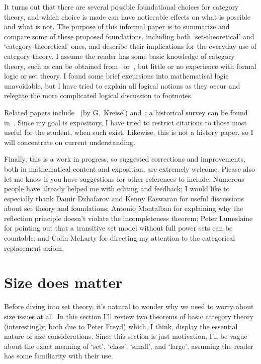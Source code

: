 \documentclass[12pt]{amsart}
\begin{document}
It turns out that there are several possible foundational choices for
category theory, and which choice is made can have noticeable effects
on what is possible and what is not.  The purpose of this informal
paper is to summarize and compare some of these proposed foundations,
including both `set-theoretical' and `category-theoretical' ones, and
describe their implications for the everyday use of category theory.
I assume the reader has some basic knowledge of category theory, such
as can be obtained from~\cite{maclane} or~\cite{awodey:cat-thy}, but
little or no experience with formal logic or set theory.  I found some
brief excursions into mathematical logic unavoidable, but I have tried
to explain all logical notions as they occur and relegate the more
complicated logical discussion to footnotes.

Related papers include~\cite[Appendix II]{feferman:fdns-of-ct} (by G.\
Kreisel) and~\cite{blass:ct-setth}; a historical survey can be found
in~\cite{kromer:tool-object}.  Since my goal is expository, I have
tried to restrict citations to those most useful for the student, when
such exist.  Likewise, this is not a history paper, so I will
concentrate on current understanding.

Finally, this is a work in progress, so suggested corrections and
improvements, both in mathematical content and exposition, are
extremely welcome.  Please also let me know if you have suggestions
for other references to include.  Numerous people have already helped
me with editing and feedback; I would like to especially thank Damir
Dzhafarov and Kenny Easwaran for useful discussions about set theory
and foundations; Antonio Montalban for explaining why the reflection
principle doesn't violate the incompleteness theorem; Peter Lumsdaine
for pointing out that a transitive set model without full power sets
can be countable; and Colin McLarty for directing my attention to the
categorical replacement axiom.


\section{Size does matter}
\label{sec:size-does-matter}

Before diving into set theory, it's natural to wonder why we need to
worry about size issues at all.  In this section I'll review two
theorems of basic category theory (interestingly, both due to Peter
Freyd) which, I think, display the essential nature of size
considerations.  Since this section is just motivation, I'll be vague
about the exact meaning of `set', `class', `small', and `large',
assuming the reader has some familiarity with their use.
\end{document}
